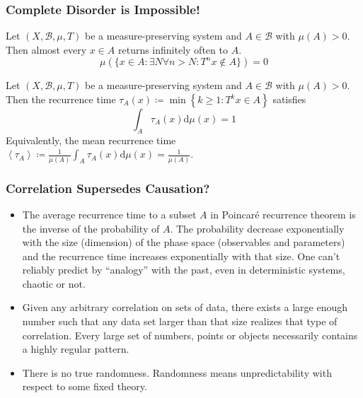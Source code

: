 \documentclass[UTF8,11pt,colorlinks,compress,openany]{beamer}%
\begin{document}
\begin{frame}\frametitle{Complete Disorder is Impossible!}
	\begin{theorem}
		Let $(X,{\mathcal{B}},\mu,T)$ be a measure-preserving system and $A\in\mathcal{B}$ with $\mu(A) > 0$. Then almost every $x\in A$ returns infinitely often to $A$.
		\[
		\mu\left(\{x\in A: \exists N\forall n>N: T^n x\notin A\}\right)=0
		\]
	\end{theorem}
	\begin{lemma}
		Let $(X,{\mathcal{B}},\mu,T)$ be a measure-preserving system and $A\in\mathcal{B}$ with $\mu(A) > 0$. Then the recurrence time $\tau_A(x)\coloneqq \min\left\{k\geq 1: T^k x\in A\right\}$ satisfies
		\[\int_A\!\tau_A(x)\mathrm{d}\mu(x)=1\]
		Equivalently, the mean recurrence time $\left\langle \tau_A\right\rangle\coloneqq \frac{1}{\mu(A)}\int_A\!\tau_A(x)\mathrm{d}\mu(x)=\frac{1}{\mu(A)}$.
	\end{lemma}
\end{frame}

\begin{frame}\frametitle{Correlation Supersedes Causation?}
	\begin{itemize}
		\item The average recurrence time to a subset $A$ in Poincar\'e recurrence theorem is the inverse of the probability of $A$. The probability decrease exponentially with the size (dimension) of the phase space (observables and parameters) and the recurrence time increases exponentially with that size. One can't reliably predict by ``analogy'' with the past, even in deterministic systems, chaotic or not.
		\item Given any arbitrary correlation on sets of data, there exists a large enough number such that any data set larger than that size realizes that type of correlation. Every large set of numbers, points or objects necessarily contains a highly regular pattern.
		\item There is no true randomness. Randomness means unpredictability with respect to some fixed theory.
	\end{itemize}
\end{frame}
\end{document}
